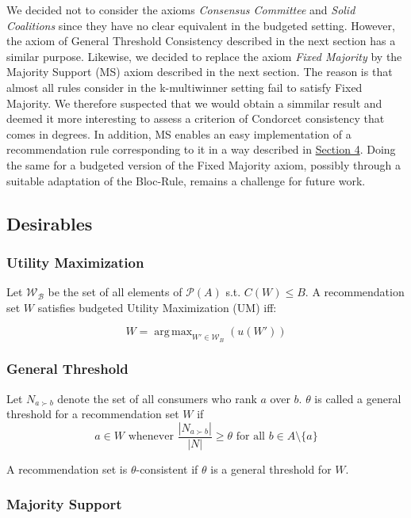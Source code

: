 \documentclass{article}
\DeclareMathOperator*{\argmax}{arg\,max}
\begin{document}
We decided not to consider the axioms \emph{Consensus Committee} and \emph{Solid Coalitions} since they have no clear equivalent in the budgeted setting. However, the axiom of General Threshold Consistency described in the next section has a similar purpose. Likewise, we decided to replace the axiom \emph{Fixed Majority} by the Majority Support (MS) axiom described in the next section. The reason is that almost all rules  consider in the k-multiwinner setting fail to satisfy Fixed Majority. We therefore suspected that we would obtain a simmilar result and deemed it more interesting to assess a criterion of Condorcet consistency that comes in degrees. In addition, MS enables an easy implementation of a  recommendation rule corresponding to it in a way described in \hyperlink{rules}{Section  4}. Doing the same for a budgeted version of the Fixed Majority axiom, possibly through a suitable adaptation of the Bloc-Rule, remains a challenge for future work.

\subsection{Desirables}
\subsubsection{Utility Maximization}

Let $\mathcal {W_B}$ be the set of all elements of $\mathcal{P}(A)$ s.t. $C(W)\leq B$. A recommendation set $W$ satisfies budgeted Utility Maximization (UM) iff:

\[
W=\argmax_{W'\in \mathcal{W}_B}(u(W'))
\]


\subsubsection{General Threshold}

Let $N_{a\succ b}$ denote the set of all consumers who rank $a$ over $b$. $\theta$ is called a general threshold for a recommendation set $W$ if \[a\in W\text{ whenever }\frac {|N_{a\succ b}|}{|N|}\geq \theta \text{ for all } b\in A\setminus \{a\} \]

A recommendation set is $\theta$-consistent if $\theta$ is a general threshold for $W$.

\subsubsection{Majority Support}
\end{document}
